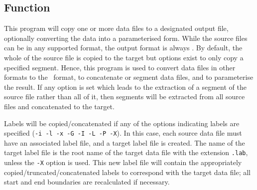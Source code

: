 %
%

\newpage
{}

\subsection{Function}

This program will copy one or more data files to a designated output
file, optionally converting the data into a parameterised form.  While
the source files can be in any supported format, the output format is
always \HTKFF.  By default, the whole of the source file is copied to
the target but options exist to only copy a specified segment.  Hence,
this program is used to convert data files in other formats to the \HTKFF\ 
format, to concatenate or segment data files, and to parameterise the
result.  If any option is set which leads to the extraction of a segment
of the source file rather than all of it, then segments will be
extracted from all source files and concatenated to the target.

Labels will be copied/concatenated if any of the options indicating
labels are specified (\texttt{-i -l -x -G -I -L -P -X}). In this case, each
source data file must have an associated label file, and a target label
file is created. The name of the target label file is the root name of
the target data file with the extension \texttt{.lab}, unless the \texttt{-X}
option is used.  This new label file will contain the appropriately
copied/truncated/concatenated labels to correspond with the target data
file; all start and end boundaries are recalculated if necessary. 

